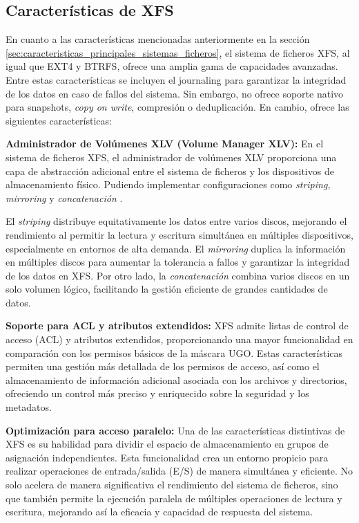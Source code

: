 \subsection{Características de XFS}

En cuanto a las características mencionadas anteriormente en la sección \ref{sec:caracteristicas_principales_sistemas_ficheros}, el sistema de ficheros XFS, al igual que EXT4 y BTRFS, ofrece una amplia gama de capacidades avanzadas. Entre estas características se incluyen el journaling para garantizar la integridad de los datos en caso de fallos del sistema. Sin embargo, no ofrece soporte nativo para snapshots, \textit{copy on write}, compresión o deduplicación. En cambio, ofrece las siguientes características:

\textbf{Administrador de Volúmenes XLV (Volume Manager XLV):} En el sistema de ficheros XFS, el administrador de volúmenes XLV proporciona una capa de abstracción adicional entre el sistema de ficheros y los dispositivos de almacenamiento físico. Pudiendo implementar configuraciones como \textit{striping}, \textit{mirroring} y \textit{concatenación} \cite{soltis2007xfs}.

El \textit{striping} distribuye equitativamente los datos entre varios discos, mejorando el rendimiento al permitir la lectura y escritura simultánea en múltiples dispositivos, especialmente en entornos de alta demanda. El \textit{mirroring} duplica la información en múltiples discos para aumentar la tolerancia a fallos y garantizar la integridad de los datos en XFS. Por otro lado, la \textit{concatenación} combina varios discos en un solo volumen lógico, facilitando la gestión eficiente de grandes cantidades de datos.

\textbf{Soporte para ACL y atributos extendidos:} XFS admite listas de control de acceso (ACL) y atributos extendidos, proporcionando una mayor funcionalidad en comparación con los permisos básicos de la máscara UGO. Estas características permiten una gestión más detallada de los permisos de acceso, así como el almacenamiento de información adicional asociada con los archivos y directorios, ofreciendo un control más preciso y enriquecido sobre la seguridad y los metadatos.

\textbf{Optimización para acceso paralelo:} Una de las características distintivas de XFS es su habilidad para dividir el espacio de almacenamiento en grupos de asignación independientes. Esta funcionalidad crea un entorno propicio para realizar operaciones de entrada/salida (E/S) de manera simultánea y eficiente. No solo acelera de manera significativa el rendimiento del sistema de ficheros, sino que también permite la ejecución paralela de múltiples operaciones de lectura y escritura, mejorando así la eficacia y capacidad de respuesta del sistema.

